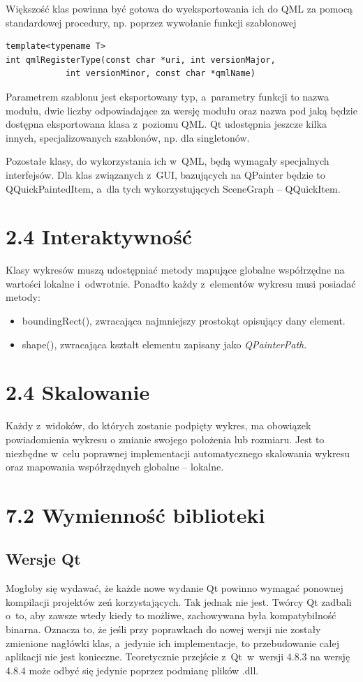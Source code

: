 \documentclass[11pt,twoside,a4paper,final]{llncs}
\begin{document}
Większość klas powinna być gotowa do wyeksportowania ich do QML za pomocą standardowej procedury, np. poprzez wywołanie funkcji szablonowej
\begin{lstlisting}
template<typename T>
int qmlRegisterType(const char *uri, int versionMajor, 
		    int versionMinor, const char *qmlName)
\end{lstlisting}
Parametrem szablonu jest eksportowany typ, a~parametry funkcji to nazwa modułu, dwie liczby odpowiadające za wersję modułu oraz nazwa pod jaką będzie dostępna eksportowana klasa z~poziomu QML. Qt udostępnia jeszcze kilka innych, specjalizowanych szablonów, np. dla singletonów.\newline

Pozostałe klasy, do wykorzystania ich w~QML, będą wymagały specjalnych interfejsów. Dla klas związanych z~GUI, bazujących na QPainter będzie to QQuickPaintedItem, a~dla tych wykorzystujących SceneGraph -- QQuickItem.


\section{2.4 Interaktywność}
Klasy wykresów muszą udostępniać metody mapujące globalne współrzędne na wartości lokalne i~odwrotnie. Ponadto każdy z~elementów wykresu musi posiadać metody:
\begin{itemize}
\item{boundingRect(), zwracająca najmniejszy prostokąt opisujący dany element.}
\item{shape(), zwracająca kształt elementu zapisany jako \textit{QPainterPath}.}
\end{itemize}

\section{2.4 Skalowanie}
Każdy z~widoków, do których zostanie podpięty wykres, ma obowiązek powiadomienia wykresu o zmianie swojego położenia lub rozmiaru. Jest to niezbędne w~celu poprawnej implementacji automatycznego skalowania wykresu oraz mapowania współrzędnych globalne -- lokalne.


\section{7.2 Wymienność biblioteki}
\subsection{Wersje Qt}
Mogłoby się wydawać, że każde nowe wydanie Qt powinno wymagać ponownej kompilacji projektów zeń korzystających. Tak jednak nie jest. Twórcy Qt zadbali o~to, aby zawsze wtedy kiedy to możliwe, zachowywana była kompatybilność binarna. Oznacza to, że jeśli przy poprawkach do nowej wersji nie zostały zmienione nagłówki klas, a~jedynie ich implementacje, to przebudowanie całej aplikacji nie jest konieczne. Teoretycznie przejście z~Qt~w~wersji 4.8.3 na wersję 4.8.4 może odbyć się jedynie poprzez podmianę plików .dll.
\end{document}
